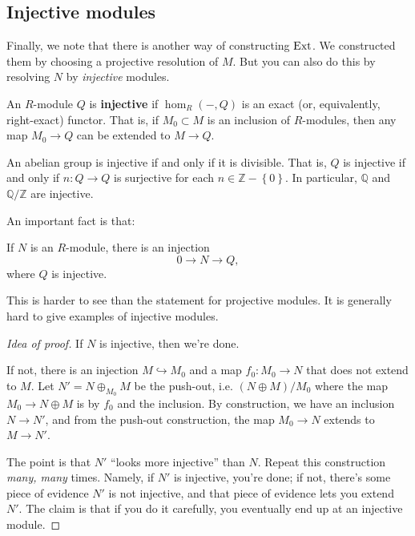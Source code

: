 \subsection{Injective modules}

Finally, we note that there is another way of constructing
$\operatorname{Ext}$. We
constructed them by choosing a projective resolution of $M$. But
you can also
do this by resolving $N$ by \emph{injective} modules.
\begin{definition}
An $R$-module $Q$ is \textbf{injective} if $\hom_R(-,Q)$ is an
exact (or,
equivalently, right-exact) functor. That is, if $M_0 \subset M$
is an inclusion
of $R$-modules, then any map $M_0 \to Q$ can be extended to $M
\to Q$.
\end{definition}


\begin{example}
An abelian group is injective if and only if it is divisible.
That is, $Q$
is injective
if and only if $n: Q \to Q$ is surjective for each $n \in
\mathbb{Z} -
\left\{0\right\}$.
In particular, $\mathbb{Q}$ and $\mathbb{Q}/\mathbb{Z}$ are
injective.
\end{example}

An important fact is that:

\begin{proposition}
If $N$ is an $R$-module, there is an injection
\[ 0 \to N \to Q,  \]
where $Q$ is injective.
\end{proposition}
This is harder to see than the statement for projective modules.
It is
generally hard to give examples of injective modules.
\begin{proof}[Idea of proof] If $N$ is injective, then we're
done.

If not, there is an injection $M \hookrightarrow M_0$ and a map
$f_0: M_0 \to N$
that does not extend to $M$. Let $N' = N \oplus_{M_0} M$ be the
push-out, i.e.
$(N \oplus M)/M_0$ where the map $M_0 \to N \oplus M$ is by
$f_0$ and the
inclusion. By construction, we have an inclusion $N \to N'$, and
from the
push-out construction, the map $M_0 \to N$ extends to $M \to
N'$.

The point is that $N'$ ``looks more injective'' than $N$. Repeat
this
construction \emph{many, many} times. Namely, if $N'$ is
injective, you're
done; if not, there's some piece of evidence $N'$ is not
injective, and that
piece of evidence lets you extend $N'$. The claim is that if
you do it
carefully, you eventually end up at an injective module.

\end{proof}


